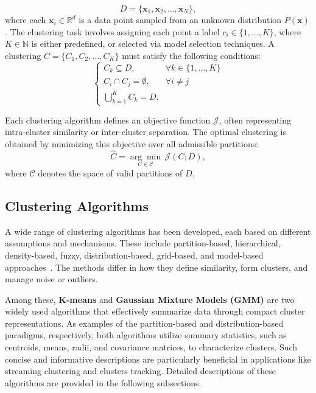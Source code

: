 \begin{equation}
    D = \{\mathbf{x}_1, \mathbf{x}_2, \ldots, \mathbf{x}_N\},
\end{equation}
where each $\mathbf{x}_i \in \mathbb{R}^d$ is a data point sampled from an unknown distribution
$P(\mathbf{x})$. The clustering task involves assigning each point a label $c_i
    \in \{1, \ldots, K\}$, where $K \in \mathbb{N}$ is either predefined,
or selected via model selection techniques.
A clustering $C = \{C_1, C_2, \ldots, C_K\}$
must satisfy the following conditions:
\begin{equation}
    \begin{cases}
        C_k \subseteq D,          & \forall k \in \{1, \ldots, K\} \\
        C_i \cap C_j = \emptyset, & \forall i \neq j               \\
        \bigcup_{k=1}^{K} C_k = D.
    \end{cases}
\end{equation}

Each clustering algorithm defines an objective function $\mathcal{J}$, often
representing intra-cluster similarity or inter-cluster separation. The optimal
clustering is obtained by minimizing this objective over all admissible
partitions:
\begin{equation}
    \hat{C} = \underset{C \in \mathcal{C}}{\arg\min} \, \mathcal{J}(C; D),
\end{equation}
where $\mathcal{C}$ denotes the space of valid partitions of $D$.

\subsection{Clustering Algorithms}
A wide range of clustering algorithms has been developed, each based on
different assumptions and mechanisms. These include partition-based,
hierarchical, density-based, fuzzy, distribution-based, grid-based, and
model-based approaches~\cite{clustering_survey}. The methods differ in how they
define similarity, form clusters, and manage noise or outliers.

Among these, \textbf{K-means} and \textbf{Gaussian Mixture Models (GMM)} are
two widely used algorithms that effectively summarize data through compact
cluster representations. As examples of the partition-based and
distribution-based paradigms, respectively, both algorithms utilize summary
statistics, such as centroids, means, radii, and covariance matrices, to
characterize clusters. Such concise and informative descriptions are
particularly beneficial in applications like streaming clustering and clusters
tracking. Detailed descriptions of these algorithms are provided in the
following subsections.

